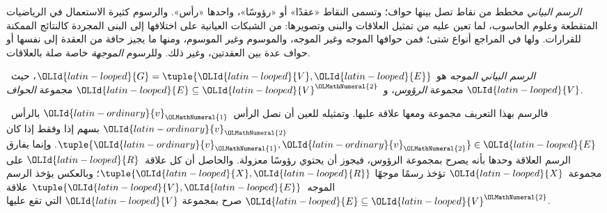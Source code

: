 \documentclass[../../../include/open-logic-section]{subfiles}
\begin{document}

\emph{الرسم البياني} مخطط من نقاط تصل بينها حواف؛ وتسمى النقاط
«عقدًا» أو «رؤوسًا»، واحدها «رأس». والرسوم كثيرة الاستعمال في
الرياضيات المتقطعة وعلوم الحاسوب، لما تعين عليه من تمثيل العلاقات
والبنى وتصويرها: من الشبكات العيانية على اختلافها إلى البنى المجردة
كالنتائج الممكنة للقرارات. ولها في المراجع أنواع شتى؛ فمن حوافها
الموجه وغير الموجه، والموسوم وغير الموسوم، ومنها ما يجيز حافة من
العقدة إلى نفسها أو حواف عدة بين العقدتين، وغير ذلك.
وللرسوم \emph{الموجهة} خاصة صلة بالعلاقات.

\begin{defn}
\emph{الرسم البياني الموجه} هو $\OLId{latin-looped}{G} = \tuple{\OLId{latin-looped}{V}, \OLId{latin-looped}{E}}$، حيث~$\OLId{latin-looped}{V}$ مجموعة
\emph{الرؤوس}، و~$\OLId{latin-looped}{E} \subseteq \OLId{latin-looped}{V}^\OLMathNumeral{2}$ مجموعة \emph{الحواف}.
\end{defn}

\begin{explain}
فالرسم بهذا التعريف مجموعة ومعها علاقة عليها. وتمثيله للعين أن
نصل الرأس~$\OLId{latin-ordinary}{v}_\OLMathNumeral{1}$ بالرأس~$\OLId{latin-ordinary}{v}_\OLMathNumeral{2}$ بسهم إذا وفقط إذا كان
$\tuple{\OLId{latin-ordinary}{v}_\OLMathNumeral{1}, \OLId{latin-ordinary}{v}_\OLMathNumeral{2}} \in \OLId{latin-looped}{E}$. وإنما يفارق الرسم العلاقة وحدها بأنه
يصرح بمجموعة الرؤوس، فيجوز أن يحتوي رؤوسًا معزولة. والحاصل أن كل
علاقة~$\OLId{latin-looped}{R}$ على مجموعة~$\OLId{latin-looped}{X}$ تؤخذ رسمًا موجهًا $\tuple{\OLId{latin-looped}{X}, \OLId{latin-looped}{R}}$؛ وبالعكس
يؤخذ الرسم الموجه~$\tuple{\OLId{latin-looped}{V}, \OLId{latin-looped}{E}}$ علاقة $\OLId{latin-looped}{E} \subseteq \OLId{latin-looped}{V}^\OLMathNumeral{2}$ صرح
بمجموعة $\OLId{latin-looped}{V}$ التي تقع عليها.
\end{explain}
\end{document}
